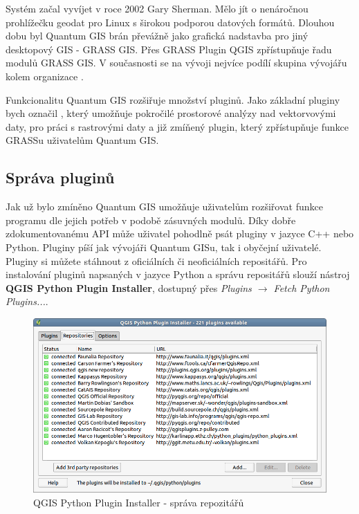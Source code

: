 Systém začal vyvíjet v roce 2002 Gary Sherman. Mělo jít o nenáročnou prohlížečku geodat pro Linux s širokou podporou datových formátů. Dlouhou dobu byl Quantum GIS brán převážně jako grafická nadstavba pro jiný desktopový GIS - GRASS GIS. Přes GRASS Plugin QGIS zpřístupňuje řadu modulů GRASS GIS. V současnosti se na vývoji nejvíce podílí skupina vývojářu kolem organizace .

Funkcionalitu Quantum GIS rozšiřuje množství pluginů. Jako základní pluginy bych označil  , který umožňuje pokročilé prostorové analýzy nad vektorvovými daty,   pro práci s rastrovými daty a již zmíňený   plugin, který zpřístupňuje funkce GRASSu uživatelům Quantum GIS. 

\subsection{Správa pluginů}
Jak už bylo zmíněno Quantum GIS umožňuje uživatelům rozšiřovat funkce programu dle jejich potřeb v podobě zásuvných modulů. Díky dobře zdokumentovanému API může uživatel pohodlně psát pluginy v jazyce C++ nebo Python. Pluginy píší jak vývojáři Quantum GISu, tak i obyčejní uživatelé. Pluginy si můžete stáhnout z oficiálních či neoficiálních repositářů. Pro instalování pluginů napsaných v jazyce Python a správu repositářů slouží nástroj \textbf{QGIS Python Plugin Installer}, dostupný přes \textit{Plugins $\rightarrow$ Fetch Python Plugins...}.

\begin{figure}
	\centering
	\includegraphics[scale=0.5]{pictures/qgis_plugin/python_installer}
	\caption{QGIS Python Plugin Installer - správa repozitářů}
  	\label{pythonplugininstaller}
\end{figure}


